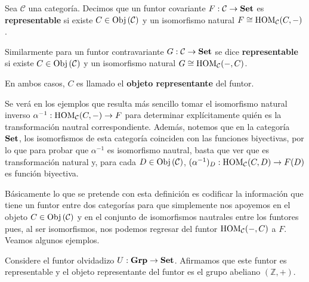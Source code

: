 \documentclass[12pt]{report}
\theoremstyle{largebreak}
\newcommand\cf[3]{\ensuremath{#1:#2\rightarrow#3}}
\newcommand{\Obj}[1]{\ensuremath{\textup{Obj}\left(#1\right)}}
\newcommand{\Cat}[1]{\ensuremath{\textup{\textbf{#1}}}}
\begin{document}
    \begin{mydef}
        Sea $\mathcal{C}$ una categoría. Decimos que un funtor covariante $\cf{F}{\mathcal{C}}{\Cat{Set}}$ es \textbf{representable} si existe $C\in\Obj{\mathcal{C}}$ y un isomorfismo natural $F\cong\textup{HOM}_{\mathcal{C}}(C,-)$. 
        
        Similarmente para un funtor contravariante $\cf{G}{\mathcal{C}}{\Cat{Set}}$ se dice \textbf{representable} si existe $C\in\Obj{\mathcal{C}}$ y un isomorfismo natural $G\cong\textup{HOM}_{\mathcal{C}}(-,C)$.
        
        En ambos casos, $C$ es llamado el \textbf{objeto representante} del funtor.
    \end{mydef}

    \begin{obs}
        Se verá en los ejemplos que resulta más sencillo tomar el isomorfismo natural inverso $\cf{\alpha^{-1}}{\HOM{\mathcal{C}}(C,-)}{F}$ para determinar explícitamente quién es la transformación nautral correspondiente. Además, notemos que en la categoría $\Cat{Set}$, los isomorfismos de esta categoría coinciden con las funciones biyectivas, por lo que para probar que $\alpha^{-1}$ es isomorfismo nautral, basta que ver que es transformación natural y, para cada $D\in\Obj{\mathcal{C}}$, $\cf{(\alpha^{-1})_D}{\HOM{\mathcal{C}}(C,D)}{F(D)}$ es función biyectiva.
    \end{obs}

    Básicamente lo que se pretende con esta definición es codificar la información que tiene un funtor entre dos categorías para que simplemente nos apoyemos en el objeto $C\in\Obj{\mathcal{C}}$ y en el conjunto de isomorfismos nautrales entre los funtores pues, al ser isomorfismos, nos podemos regresar del funtor $\textup{HOM}_{\mathcal{C}}(-,C)$ a $F$. Veamos algunos ejemplos.

    \begin{exa}
        Considere el funtor olvidadizo $\cf{U}{\Cat{Grp}}{\Cat{Set}}$. Afirmamos que este funtor es representable y el objeto representante del funtor es el grupo abeliano $(\mathbb{Z},+)$.
    \end{exa}
\end{document}
